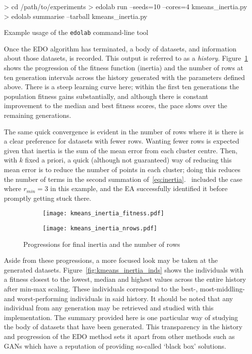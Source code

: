 \begin{listing}
\begin{usagesh}
> cd /path/to/experiments
> edolab run --seeds=10 --cores=4 kmeans_inertia.py
> edolab summarise --tarball kmeans_inertia.py
\end{usagesh}
\caption{Example usage of the \texttt{edolab} command-line tool}
\label{snp:edolab}
\end{listing}

Once the EDO algorithm has terminated, a body of datasets, and information about
those datasets, is recorded. This output is referred to as a \emph{history}.
Figure~\ref{fig:inertia_progression} shows the progression of the fitness
function (inertia) and the number of rows at ten generation intervals across the
history generated with the parameters defined above. There is a steep learning
curve here; within the first ten generations the population fitness gains
substantially, and although there is constant improvement to the median and best
fitness scores, the pace slows over the remaining generations.

The same quick convergence is evident in the number of rows where it is there is
a clear preference for datasets with fewer rows. Wanting fewer rows is
expected given that inertia is the sum of the mean error from each cluster
centre. Then, with \(k\) fixed a priori, a quick (although not guaranteed) way
of reducing this mean error is to reduce the number of points in each cluster;
doing this reduces the number of terms in the second summation
of~\eqref{eq:inertia}.~\cite{Wilde2020:edo} included the case where
\(r_{min}=3\) in this example, and the EA successfully identified it before
promptly getting stuck there.

\begin{figure}
    \centering
    \begin{subfigure}{\imgwidth}
        \texttt{[image: kmeans\_inertia\_fitness.pdf]}%
    \end{subfigure}

    \begin{subfigure}{\imgwidth}
        \texttt{[image: kmeans\_inertia\_nrows.pdf]}%
    \end{subfigure}
    \caption{%
        Progressions for final inertia and the number of rows
    }\label{fig:inertia_progression}
\end{figure}

Aside from these progressions, a more focused look may be taken at the generated
datasets. Figure~\ref{fig:kmeans_inertia_inds} shows the individuals with a
fitness closest to the lowest, median and highest values across the entire
history after min-max scaling. These individuals correspond to the best-,
most-middling- and worst-performing individuals in said history. It should be
noted that any individual from any generation may be retrieved and studied with
this implementation. The summary provided here is one particular way of studying
the body of datasets that have been generated. This transparency in the history
and progression of the EDO method sets it apart from other methods such as GANs
which have a reputation of providing so-called `black box' solutions.

